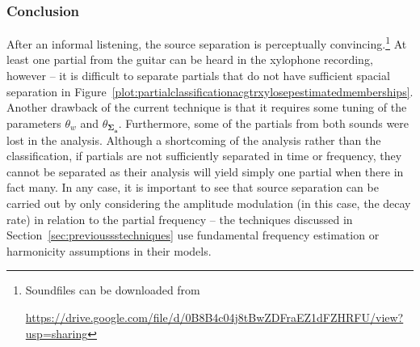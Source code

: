 \documentclass[letterpaper,12pt]{report}
\begin{document}
\subsubsection{Conclusion}

After an informal listening, the
source separation is perceptually convincing.\footnote{Soundfiles can be
downloaded from \par
\url{https://drive.google.com/file/d/0B8B4c04j8tBwZDFraEZ1dFZHRFU/view?usp=sharing}}
At least one partial from the guitar can be heard in the xylophone recording,
however --
it is difficult to separate partials that do not have sufficient spacial separation in
Figure~\ref{plot:partialclassificationacgtrxylosepestimatedmemberships}. Another drawback of the current technique is that it requires some
tuning of the parameters $\theta_{w}$ and
$\theta_{\boldsymbol{\Sigma_{\boldsymbol{a}}}}$. Furthermore, some of the
partials from both sounds were lost in the analysis. Although a shortcoming of
the analysis rather than the classification, if partials are not sufficiently
separated in time or frequency, they cannot be separated as their analysis will
yield simply one partial when there in fact many. In any case, it is important
to see that source separation can be carried out by only considering the
amplitude modulation (in this case, the decay rate) in relation to the partial
frequency -- the techniques discussed in Section~\ref{sec:previoussstechniques}
use fundamental frequency estimation or harmonicity assumptions in their models.




\end{document}
